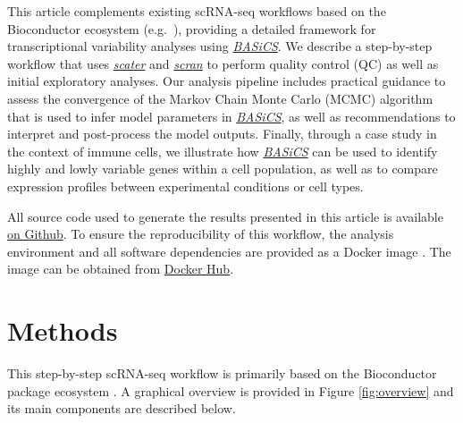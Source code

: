 \documentclass[9pt,a4paper,]{extarticle}
\begin{document}
This article complements existing scRNA-seq workflows based on the Bioconductor
ecosystem (e.g.~\citep{Lun2016, Kim2019}), providing a detailed framework for
transcriptional variability analyses using \emph{\href{https://bioconductor.org/packages/3.11/BASiCS}{BASiCS}}.
We describe a step-by-step workflow that uses \emph{\href{https://bioconductor.org/packages/3.11/scater}{scater}}
\citep{McCarthy2017} and \emph{\href{https://bioconductor.org/packages/3.11/scran}{scran}} \citep{Lun2016} to perform quality control
(QC) as well as initial exploratory analyses.
Our analysis pipeline includes practical guidance to assess the convergence of
the Markov Chain Monte Carlo (MCMC) algorithm that is used to infer model
parameters in \emph{\href{https://bioconductor.org/packages/3.11/BASiCS}{BASiCS}}, as well as recommendations to interpret
and post-process the model outputs.
Finally, through a case study in the context of immune cells, we illustrate
how \emph{\href{https://bioconductor.org/packages/3.11/BASiCS}{BASiCS}} can be used to identify highly and lowly variable
genes within a cell population, as well as to compare expression profiles
between experimental conditions or cell types.

All source code used to generate the results presented in this article is
available \href{https://github.com/VallejosGroup/BASiCSWorkflow}{on Github}.
To ensure the
reproducibility of this workflow, the analysis environment and all software
dependencies are provided as a Docker image \citep{Boettiger2015}. The image
can be obtained from
\href{https://hub.docker.com/repository/docker/alanocallaghan/bocker}{Docker Hub}.

\hypertarget{methods}{%
\section{Methods}\label{methods}}

This step-by-step scRNA-seq workflow is primarily based on the Bioconductor
package ecosystem \citep{Amezquita2019}.
A graphical overview is provided in Figure \ref{fig:overview}
and its main components are described below.
\end{document}
